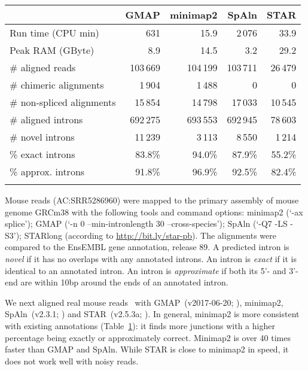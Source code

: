\documentclass{bioinfo}
\begin{document}
\begin{table}[!tb]
{\footnotesize\label{tab:intron}
\begin{tabular}{p{3.1cm}rrrr}
\toprule
& GMAP & minimap2 & SpAln & STAR\\
\midrule
Run time (CPU min)        & 631      & 15.9     & 2\,076   & 33.9 \\
Peak RAM (GByte)          & 8.9      & 14.5     & 3.2      & 29.2\vspace{1em}\\
\# aligned reads          & 103\,669 & 104\,199 & 103\,711 & 26\,479 \\
\# chimeric alignments    & 1\,904   & 1\,488   & 0        & 0 \\
\# non-spliced alignments & 15\,854  & 14\,798  & 17\,033  & 10\,545\vspace{1em}\\
\# aligned introns        & 692\,275 & 693\,553 & 692\,945 & 78\,603 \\
\# novel introns          & 11\,239  & 3\,113   & 8\,550   & 1\,214 \\
\% exact introns          & 83.8\%   & 94.0\%   & 87.9\%   & 55.2\% \\
\% approx. introns        & 91.8\%   & 96.9\%   & 92.5\%   & 82.4\% \\
\botrule
\end{tabular}
}{Mouse reads (AC:SRR5286960) were mapped to the primary assembly of mouse
genome GRCm38 with the following tools and command options: minimap2 (`-ax
splice'); GMAP (`-n 0 --min-intronlength 30 --cross-species'); SpAln (`-Q7 -LS
-S3'); STARlong (according to
\href{http://bit.ly/star-pb}{http://bit.ly/star-pb}). The alignments were
compared to the EnsEMBL gene annotation, release 89. A predicted intron
is \emph{novel} if it has no overlaps with any annotated introns. An intron
is \emph{exact} if it is identical to an annotated intron. An intron is
\emph{approximate} if both its 5'- and 3'-end are within 10bp around the ends
of an annotated intron.}
\end{table}

We next aligned real mouse reads~\citep{Byrne:2017aa} with GMAP~(v2017-06-20;
\citealp{Wu:2005vn}), minimap2, SpAln~(v2.3.1; \citealp{Iwata:2012aa}) and
STAR~(v2.5.3a; \citealp{Dobin:2013kx}). In general, minimap2 is more
consistent with existing annotations (Table~\ref{tab:intron}): it finds
more junctions with a higher percentage being exactly or approximately correct.
Minimap2 is over 40 times faster than GMAP and SpAln. While STAR is close to
minimap2 in speed, it does not work well with noisy reads.
\end{document}
